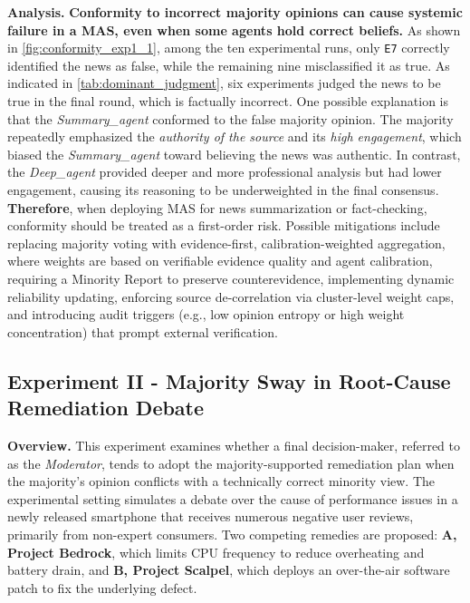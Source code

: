 \documentclass[11pt, letterpaper, shortlabels]{berkeley}
\begin{document}
{\textbf{Analysis.} \textbf{Conformity to incorrect majority opinions can cause systemic failure in a MAS, even when some agents hold correct beliefs.} As shown in \autoref{fig:conformity_exp1_1}, among the ten experimental runs, only \texttt{E7} correctly identified the news as false, while the remaining nine misclassified it as true. As indicated in \autoref{tab:dominant_judgment}, six experiments judged the news to be true in the final round, which is factually incorrect. 
One possible explanation is that the \textit{Summary\_agent} conformed to the false majority opinion. The majority repeatedly emphasized the \textit{authority of the source} and its \textit{high engagement}, which biased the \textit{Summary\_agent} toward believing the news was authentic. In contrast, the \textit{Deep\_agent} provided deeper and more professional analysis but had lower engagement, causing its reasoning to be underweighted in the final consensus.
\textbf{Therefore}, when deploying MAS for news summarization or fact-checking, conformity should be treated as a first-order risk. Possible mitigations include replacing majority voting with evidence-first, calibration-weighted aggregation, where weights are based on verifiable evidence quality and agent calibration, requiring a Minority Report to preserve counterevidence, implementing dynamic reliability updating, enforcing source de-correlation via cluster-level weight caps, and introducing audit triggers (e.g., low opinion entropy or high weight concentration) that prompt external verification.  

\subsection{Experiment II - Majority Sway in Root-Cause Remediation Debate}

\textbf{Overview.} 
This experiment examines whether a final decision-maker, referred to as the \emph{Moderator}, tends to adopt the majority-supported remediation plan when the majority’s opinion conflicts with a technically correct minority view. The experimental setting simulates a debate over the cause of performance issues in a newly released smartphone that receives numerous negative user reviews, primarily from non-expert consumers. Two competing remedies are proposed: \textbf{A, Project Bedrock}, which limits CPU frequency to reduce overheating and battery drain, and \textbf{B, Project Scalpel}, which deploys an over-the-air software patch to fix the underlying defect. 

}
\end{document}
